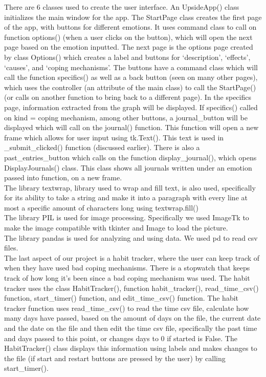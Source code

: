 \documentclass{article}
\begin{document}
    There are 6 classes used to create the user interface. An UpsideApp() class initializes the main window for the app. The StartPage class creates the first page of the app, with buttons for different emotions. It uses command class to call on function options() (when a user clicks on the button), which will open the next page based on the emotion inputted. The next page is the options page created by class Options() which creates a label and buttons for ‘description’, ‘effects’, ‘causes’, and ‘coping mechanisms’. The buttons have a command class which will call the function specifics() as well as a back button (seen on many other pages), which uses the controller (an attribute of the main class) to call the StartPage() (or calls on another function to bring back to a different page). In the specifics page, information extracted from the graph will be displayed. If specifics() called on kind = coping mechanism, among other buttons, a journal\_button will be displayed which will call on the journal() function. This function will open a new frame which allows for user input using tk.Text(). This text is used in \_submit\_clicked() function (discussed earlier). There is also a past\_entries\_button which calls on the function display\_journal(), which opens DisplayJournals() class. This class shows all journals written under an emotion passed into function, on a new frame. \\


    The library textwrap, library used to wrap and fill text, is also used, specifically for its ability to take a string and make it into a paragraph with every line at most a specific amount of characters long using textwrap.fill() \\

    The library PIL is used for image processing. Specifically we used ImageTk to make the image compatible with tkinter and Image to load the picture. \\

    The library pandas is used for analyzing and using data. We used pd to read csv files. \\

    The last aspect of our project is a habit tracker, where the user can keep track of when they have used bad coping mechanisms. There is a stopwatch that keeps track of how long it’s been since a bad coping mechanism was used. The habit tracker uses the class HabitTracker(), function habit\_tracker(), read\_time\_csv() function, start\_timer() function, and edit\_time\_csv() function. The habit tracker function uses read\_time\_csv() to read the time csv file, calculate how many days have passed, based on the amount of days on the file, the current date and the date on the file and then edit the time csv file, specifically the past time and days passed to this point, or changes days to 0 if started is False. The HabitTracker() class displays this information using labels and makes changes to the file (if start and restart buttons are pressed by the user) by calling start\_timer().
\end{document}
